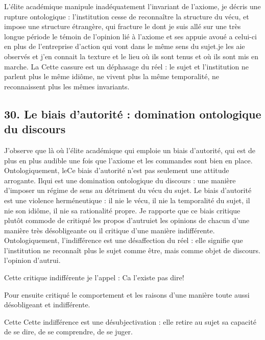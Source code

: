 \documentclass[12pt,letterpaper,oneside]{article}
\begin{document}
L’élite académique manipule inadéquatement l’invariant de l’axiome, je décris une rupture ontologique : l’institution cesse de reconnaître la structure du vécu, et impose une structure étrangère, qui fracture le dont je suis allé sur une très longue période le témoin de l’opinion lié à l’axiome et ses appuie avoué a celui-ci en plus de l’entreprise d’action qui vont dans le même sens du sujet.je les aie observés et j’en connait la texture et le lieu où ils sont tenus et où ils sont mis en marche. La
Cette cassure est un déphasage du réel : le sujet et l’institution ne parlent plus le même idiôme, ne vivent plus la même temporalité, ne reconnaissent plus les mêmes invariants.

\subsection*{30. Le biais d’autorité : domination ontologique du discours}
J’observe que là où l’élite académique qui emploie un biais d’autorité,  qui est de plus en plus audible une fois que l’axiome et les commandes sont bien en place. Ontologiquement, leCe biais d’autorité n’est pas seulement une attitude arrogante. Ilqui est une domination ontologique du discours : une manière d’imposer un régime de sens au détriment du vécu du sujet.
Le biais d’autorité est une violence herméneutique : il nie le vécu, il nie la temporalité du sujet, il nie son idiôme, il nie sa rationalité propre.
Je rapporte que ce biais critique plutôt commode de critiqué les propos d’autruiet les opinions de chacun d’une manière très désobligeante ou il critique d’une manière indifférente. Ontologiquement, l’indifférence est une désaffection du réel : elle signifie que l’institution ne reconnaît plus le sujet comme être, mais comme objet de discours. l’opinion d’autrui.

Cette critique indifférente je l’appel : Ca l’existe pas dire!

Pour ensuite critiqué le comportement et les raisons d’une manière toute aussi désobligeant et indifférente.

Cette Cette indifférence est une désubjectivation : elle retire au sujet sa capacité de se dire, de se comprendre, de se juger.
\end{document}
